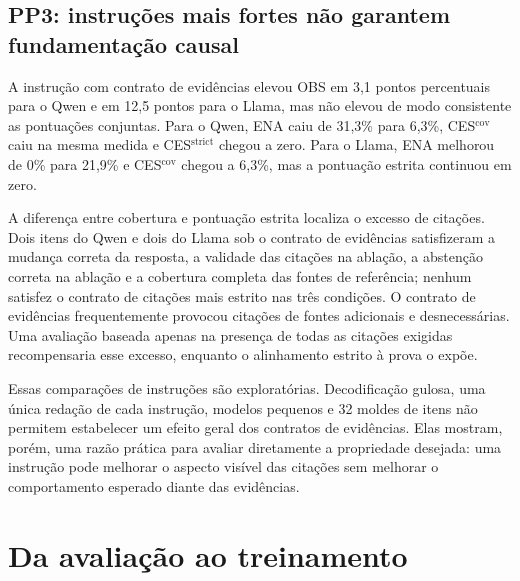 \documentclass[10pt,twocolumn]{article}
\begin{document}
\subsection{PP3: instruções mais fortes não garantem fundamentação causal}

A instrução com contrato de evidências elevou OBS em 3,1 pontos percentuais para o Qwen e em 12,5 pontos para o Llama, mas não elevou de modo consistente as pontuações conjuntas. Para o Qwen, ENA caiu de 31,3\% para 6,3\%, CES$^{\mathrm{cov}}$ caiu na mesma medida e CES$^{\mathrm{strict}}$ chegou a zero. Para o Llama, ENA melhorou de 0\% para 21,9\% e CES$^{\mathrm{cov}}$ chegou a 6,3\%, mas a pontuação estrita continuou em zero.

A diferença entre cobertura e pontuação estrita localiza o excesso de citações. Dois itens do Qwen e dois do Llama sob o contrato de evidências satisfizeram a mudança correta da resposta, a validade das citações na ablação, a abstenção correta na ablação e a cobertura completa das fontes de referência; nenhum satisfez o contrato de citações mais estrito nas três condições. O contrato de evidências frequentemente provocou citações de fontes adicionais e desnecessárias. Uma avaliação baseada apenas na presença de todas as citações exigidas recompensaria esse excesso, enquanto o alinhamento estrito à prova o expõe.

Essas comparações de instruções são exploratórias. Decodificação gulosa, uma única redação de cada instrução, modelos pequenos e 32 moldes de itens não permitem estabelecer um efeito geral dos contratos de evidências. Elas mostram, porém, uma razão prática para avaliar diretamente a propriedade desejada: uma instrução pode melhorar o aspecto visível das citações sem melhorar o comportamento esperado diante das evidências.

\section{Da avaliação ao treinamento}
\end{document}
